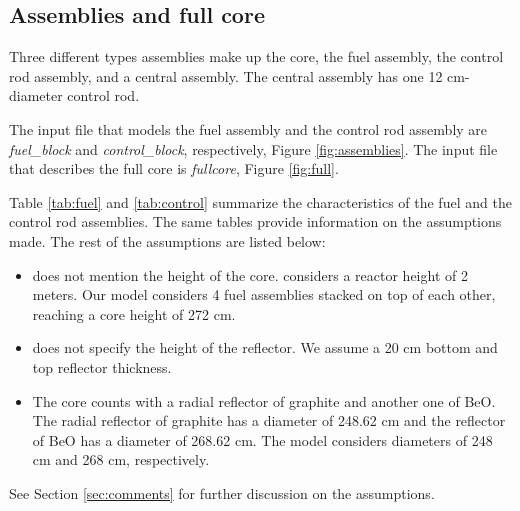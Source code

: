 \documentclass[11pt,letterpaper]{article}
\begin{document}
\begin{table}[htbp!]
\begin{tabular}{l|l|l}
		\end{tabular}
	\end{table}

\subsection{Assemblies and full core}

Three different types assemblies make up the core, the fuel assembly, the control rod assembly, and a central assembly.
The central assembly has one 12 cm-diameter control rod.

The input file that models the fuel assembly and the control rod assembly are \textit{fuel\_block} and \textit{control\_block}, respectively, Figure \ref{fig:assemblies}.
The input file that describes the full core is \textit{fullcore}, Figure \ref{fig:full}.

Table \ref{tab:fuel} and \ref{tab:control} summarize the characteristics of the fuel and the control rod assemblies.
The same tables provide information on the assumptions made.
The rest of the assumptions are listed below:

\begin{itemize}
	\item \cite{hawari_development_2018} does not mention the height of the core. \cite{venneri_neutronic_2015} considers a reactor height of 2 meters. Our model considers 4 fuel assemblies stacked on top of each other, reaching a core height of 272 cm.
	\item \cite{hawari_development_2018} does not specify the height of the reflector. We assume a 20 cm bottom and top reflector thickness.
	\item The core counts with a radial reflector of graphite and another one of BeO.
	The radial reflector of graphite has a diameter of 248.62 cm and the reflector of BeO has a diameter of 268.62 cm\cite{hawari_development_2018}.
	The model considers diameters of 248 cm and 268 cm, respectively.

\end{itemize}

See Section \ref{sec:comments} for further discussion on the assumptions.
\end{document}
